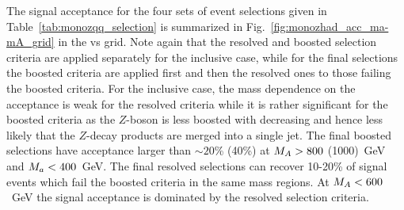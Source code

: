 The signal acceptance for the four sets of event selections given in Table~\ref{tab:monozqq_selection} is 
summarized in Fig.~\ref{fig:monozhad_acc_ma-mA_grid} in the \ma vs \mA grid. Note again that the resolved and boosted 
selection criteria are applied separately for the inclusive case, while for the final selections the boosted criteria are 
applied first and then the resolved ones to those failing the boosted criteria. 
For the inclusive case, the mass dependence on the acceptance is weak for the resolved criteria 
while it is rather significant for the boosted criteria 
as the $Z$-boson is less boosted with decreasing \mA and hence less likely that the $Z$-decay products are merged 
into a single jet. The final boosted selections have acceptance larger than $\sim20$\% (40\%) at 
$M_{A}>800$ (1000)~GeV and $M_{a}<400$~GeV. The final resolved selections can recover 10-20\% of signal 
events which fail the boosted criteria in the same mass regions. At $M_{A}<600$~GeV the signal acceptance 
is dominated by the resolved selection criteria.


